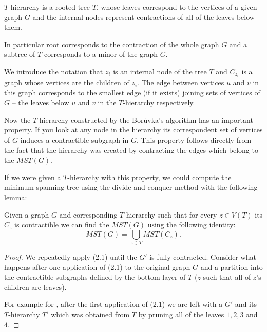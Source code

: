 \begin{definition}[$T$-hierarchy]
    $T$-hierarchy is a rooted tree $T$, whose leaves correspond to the vertices of a given graph $G$ and the internal nodes represent contractions of all of the leaves below them.  
\end{definition}
In particular root corresponds to the contraction of the whole graph $G$ and a subtree of $T$ corresponds to a minor of the graph $G$.

\begin{definition}
We introduce the notation that $z_i$ is an internal node of the tree $T$ and $C_{z_i}$ is a graph whose vertices are the children of $z_i$. The edge between vertices $u$ and $v$ in this graph corresponds to the smallest edge (if it exists) joining sets of vertices of $G$ -- the leaves below $u$ and $v$ in the $T$-hierarchy respectively.   
\end{definition}

Now the $T$-hierarchy constructed by the Borůvka's algorithm has an important property. If you look at any node in the hierarchy its correspondent set of vertices of $G$ induces a contractible subgraph in $G$. This property follows directly from the fact that the hierarchy was created by contracting the edges which belong to the $MST(G)$.

If we were given a $T$-hierarchy with this property, we could compute the minimum spanning tree using the divide and conquer method with the following lemma:
\begin{lemma}
Given a graph $G$ and corresponding $T$-hierarchy such that for every $z\in V(T)$ its $C_{z}$ is contractible we can find the $MST(G)$ using the following identity:
\begin{equation*}
    MST(G) = \bigcup\limits_{z\in T}MST(C_z).
\end{equation*}
\label{divide-conq}
\end{lemma}
\begin{proof}
    We repeatedly apply (2.1) until the $G'$ is fully contracted. Consider what happens after one application of (2.1) to the original graph $G$ and a partition into the contractible subgraphs defined by the bottom layer of $T$ ($z$ such that all of $z$'s children are leaves). 
    
    For example for , after the first application of (2.1) we are left with a $G'$ and its $T$-hierarchy $T'$ which was obtained from $T$ by pruning all of the leaves $1, 2, 3$ and $4$. 
\end{proof}

